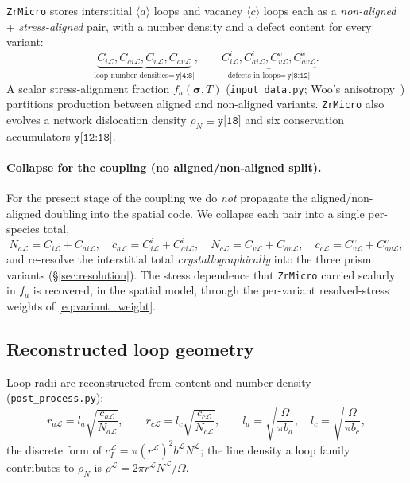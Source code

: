 \documentclass[11pt]{article}
\newcommand{\sig}{\bm{\sigma}}
\newcommand{\Oh}{\Omega}
\newcommand{\Lcal}{\mathcal{L}}
\newcommand{\ZrMicro}{\texttt{ZrMicro}}
\newcommand{\code}[1]{\texttt{#1}}
\begin{document}
\ZrMicro{} stores interstitial $\langle a\rangle$ loops and vacancy
$\langle c\rangle$ loops each as a \emph{non-aligned} + \emph{stress-aligned}
pair, with a number density and a defect content for every variant:
\begin{equation}
\label{eq:zr_immobile_state}
    \underbrace{C_{i\Lcal},C_{ai\Lcal},C_{v\Lcal},C_{av\Lcal}}_{\text{loop number densities}=\,\texttt{y[4:8]}},
    \qquad
    \underbrace{C_{i\Lcal}^{i},C_{ai\Lcal}^{i},C_{v\Lcal}^{v},C_{av\Lcal}^{v}}_{\text{defects in loops}=\,\texttt{y[8:12]}}.
\end{equation}
A scalar stress-alignment fraction $f_a(\sig,T)$ (\code{input\_data.py};
Woo's anisotropy~\cite{Woo1988}) partitions production between aligned and
non-aligned variants. \ZrMicro{} also evolves a network dislocation density
$\rho_N\equiv\texttt{y[18]}$ and six conservation accumulators
$\texttt{y[12:18]}$.

\paragraph{Collapse for the coupling (no aligned/non-aligned split).}
For the present stage of the coupling we do \emph{not} propagate the
aligned/non-aligned doubling into the spatial code. We collapse each pair into a
single per-species total,
\begin{equation}
\label{eq:collapse}
    N_{a\Lcal}=C_{i\Lcal}+C_{ai\Lcal},\quad
    c_{a\Lcal}=C_{i\Lcal}^{i}+C_{ai\Lcal}^{i},\quad
    N_{c\Lcal}=C_{v\Lcal}+C_{av\Lcal},\quad
    c_{c\Lcal}=C_{v\Lcal}^{v}+C_{av\Lcal}^{v},
\end{equation}
and re-resolve the interstitial total \emph{crystallographically} into the three
prism variants (\S\ref{sec:resolution}). The stress dependence that \ZrMicro{}
carried scalarly in $f_a$ is recovered, in the spatial model, through the
per-variant resolved-stress weights of \eqref{eq:variant_weight}.

\subsection{Reconstructed loop geometry}
\label{sec:radii}

Loop radii are reconstructed from content and number density
(\code{post\_process.py}):
\begin{equation}
\label{eq:zr_radii}
    r_{a\Lcal} = l_a\sqrt{\frac{c_{a\Lcal}}{N_{a\Lcal}}},
    \qquad
    r_{c\Lcal} = l_c\sqrt{\frac{c_{c\Lcal}}{N_{c\Lcal}}},
    \qquad
    l_a = \sqrt{\frac{\Oh}{\pi b_a}},
    \quad
    l_c = \sqrt{\frac{\Oh}{\pi b_c}},
\end{equation}
the discrete form of $c_I^{\Lcal}=\pi (r^{\Lcal})^2 b^{\Lcal} N^{\Lcal}$; the
line density a loop family contributes to $\rho_N$ is
$\rho^{\Lcal}=2\pi r^{\Lcal} N^{\Lcal}/\Oh$.
\end{document}
